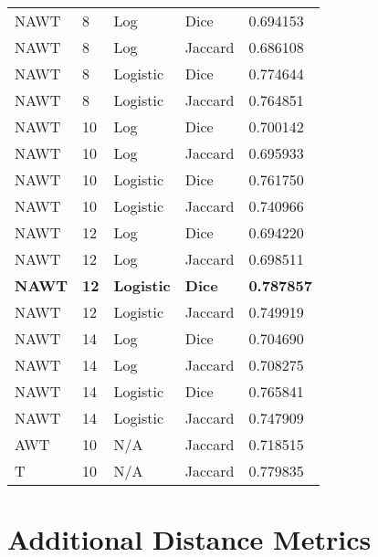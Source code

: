 \documentclass{article}
\begin{document}
\begin{center}
	\scriptsize
    
    \tablelasttail{\hline}

      \begin{supertabular}{| l | l | l | l | l |}
            NAWT & 8 & Log & Dice & 0.694153 \\
            NAWT & 8 & Log & Jaccard & 0.686108 \\
            NAWT & 8 & Logistic & Dice & 0.774644 \\
            NAWT & 8 & Logistic & Jaccard & 0.764851 \\
            NAWT & 10 & Log & Dice & 0.700142 \\
            NAWT & 10 & Log & Jaccard & 0.695933 \\
            NAWT & 10 & Logistic & Dice & 0.761750 \\
            NAWT & 10 & Logistic & Jaccard & 0.740966 \\
            NAWT & 12 & Log & Dice & 0.694220 \\
            NAWT & 12 & Log & Jaccard & 0.698511 \\
            \textbf{NAWT} & \textbf{12} & \textbf{Logistic} & \textbf{Dice} & \textbf{0.787857} \\
            NAWT & 12 & Logistic & Jaccard & 0.749919 \\
            NAWT & 14 & Log & Dice & 0.704690 \\
            NAWT & 14 & Log & Jaccard & 0.708275 \\
            NAWT & 14 & Logistic & Dice & 0.765841 \\
            NAWT & 14 & Logistic & Jaccard & 0.747909 \\
            AWT & 10 & N/A & Jaccard & 0.718515 \\
            T & 10 & N/A & Jaccard & 0.779835 \\
         \hline
      \end{supertabular}
\end{center}

\section{Additional Distance Metrics}
\label{additional-distance-metrics}
\end{document}
